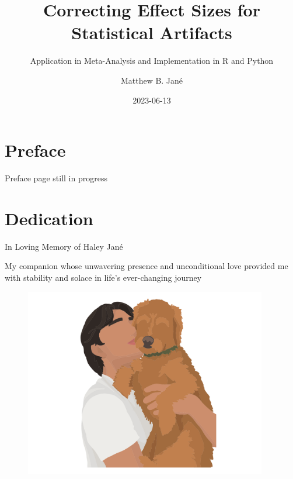 \documentclass[
  letterpaper,
  DIV=11,
  numbers=noendperiod]{scrreprt}
\title{Correcting Effect Sizes for Statistical Artifacts}
\subtitle{Application in Meta-Analysis and Implementation in R and
Python}
\author{Matthew B. Jané}
\date{2023-06-13}
\renewcommand*\contentsname{Table of contents}
\newcommand\contentsname{Table of contents}
\begin{document}
\maketitle
\ifdefined\Shaded\renewenvironment{Shaded}{\begin{tcolorbox}[breakable, borderline west={3pt}{0pt}{shadecolor}, enhanced, sharp corners, boxrule=0pt, interior hidden, frame hidden]}{\end{tcolorbox}}\fi

\renewcommand*\contentsname{Table of contents}
{
\hypersetup{linkcolor=}
\setcounter{tocdepth}{2}
\tableofcontents
}

\hypertarget{preface}{%
\chapter{Preface}\label{preface}}

Preface page still in progress


\hypertarget{dedication}{%
\chapter{Dedication}\label{dedication}}

In Loving Memory of Haley Jané

My companion whose unwavering presence and unconditional love provided
me with stability and solace in life's ever-changing journey

\begin{figure}

{\centering \includegraphics[width=4.16667in,height=\textheight]{figure/dedication_2.png}

}

\end{figure}
\end{document}
